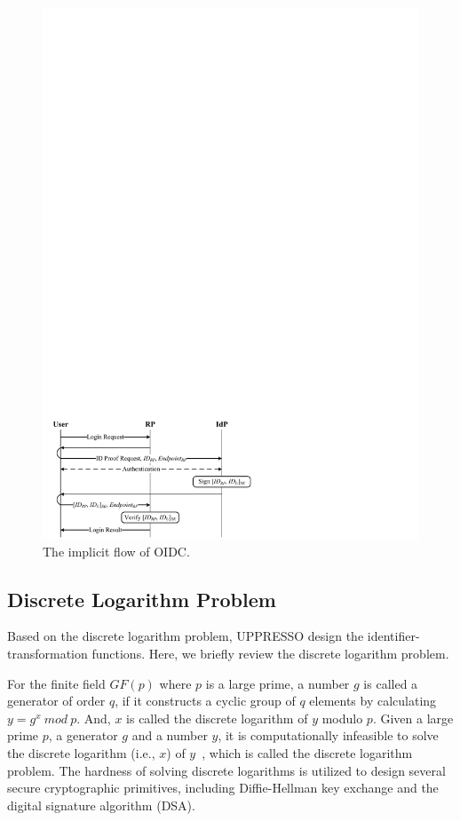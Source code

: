 \begin{figure}[t]
  \centering
  \includegraphics[width=0.95\linewidth]{fig/OIDC1.pdf}
  \caption{The implicit flow of OIDC.}
  \label{fig:OpenID}
\end{figure}

\subsection{Discrete Logarithm Problem}
\label{sec:dlp}

Based on the discrete logarithm problem, UPPRESSO design the identifier-transformation functions. %
Here, we briefly review the discrete logarithm problem.

For the finite field $GF(p)$ where $p$ is a large prime, a number $g$ is called a generator of order $q$, if it constructs a cyclic  group of $q$ elements by calculating $y=g^x \ mod\ p$.
And, $x$ is called the discrete logarithm of $y$ modulo $p$. Given a large prime $p$, a generator $g$ and a number $y$, it is computationally infeasible to solve the discrete logarithm (i.e., $x$) of $y$~\cite{WXWM}, which is called the discrete logarithm problem.
The hardness of solving discrete logarithms is utilized to design several secure cryptographic primitives, including Diffie-Hellman key exchange and the digital signature algorithm (DSA).


